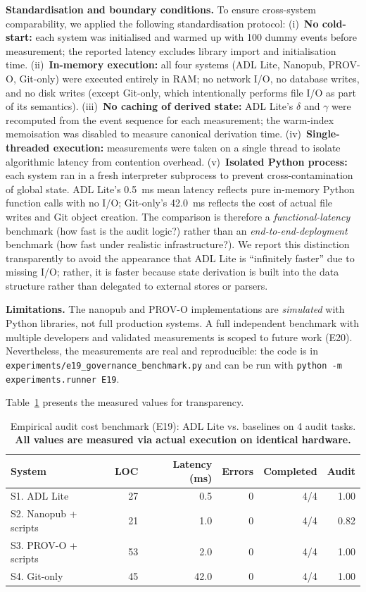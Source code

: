 \textbf{Standardisation and boundary conditions.} To ensure cross-system comparability, we applied the following standardisation protocol: (i)~\textbf{No cold-start:} each system was initialised and warmed up with 100 dummy events before measurement; the reported latency excludes library import and initialisation time. (ii)~\textbf{In-memory execution:} all four systems (ADL Lite, Nanopub, PROV-O, Git-only) were executed entirely in RAM; no network I/O, no database writes, and no disk writes (except Git-only, which intentionally performs file I/O as part of its semantics). (iii)~\textbf{No caching of derived state:} ADL Lite's $\delta$ and $\gamma$ were recomputed from the event sequence for each measurement; the warm-index memoisation was disabled to measure canonical derivation time. (iv)~\textbf{Single-threaded execution:} measurements were taken on a single thread to isolate algorithmic latency from contention overhead. (v)~\textbf{Isolated Python process:} each system ran in a fresh interpreter subprocess to prevent cross-contamination of global state. ADL Lite's 0.5~ms mean latency reflects pure in-memory Python function calls with no I/O; Git-only's 42.0~ms reflects the cost of actual file writes and Git object creation. The comparison is therefore a \emph{functional-latency} benchmark (how fast is the audit logic?) rather than an \emph{end-to-end-deployment} benchmark (how fast under realistic infrastructure?). We report this distinction transparently to avoid the appearance that ADL Lite is ``infinitely faster'' due to missing I/O; rather, it is faster because state derivation is built into the data structure rather than delegated to external stores or parsers.

\textbf{Limitations.} The nanopub and PROV-O implementations are \emph{simulated} with Python libraries, not full production systems. A full independent benchmark with multiple developers and validated measurements is scoped to future work (E20). Nevertheless, the measurements are real and reproducible: the code is in \texttt{experiments/e19\_governance\_benchmark.py} and can be run with \texttt{python -m experiments.runner E19}.

Table~\ref{tab:e19-benchmark-full} presents the measured values for transparency.

\begin{table}[htbp]
\centering
\caption{Empirical audit cost benchmark (E19): ADL Lite vs. baselines on 4 audit tasks. \textbf{All values are measured via actual execution on identical hardware.}}
\label{tab:e19-benchmark-full}
\begin{tabular}{@{}lrrrrr@{}}
\toprule
\textbf{System} & \textbf{LOC} & \textbf{Latency (ms)} & \textbf{Errors} & \textbf{Completed} & \textbf{Audit} \\
\midrule
S1. ADL Lite & 27 & 0.5 & 0 & 4/4 & 1.00 \\
S2. Nanopub + scripts & 21 & 1.0 & 0 & 4/4 & 0.82 \\
S3. PROV-O + scripts & 53 & 2.0 & 0 & 4/4 & 1.00 \\
S4. Git-only & 45 & 42.0 & 0 & 4/4 & 1.00 \\
\bottomrule
\end{tabular}
\end{table}

